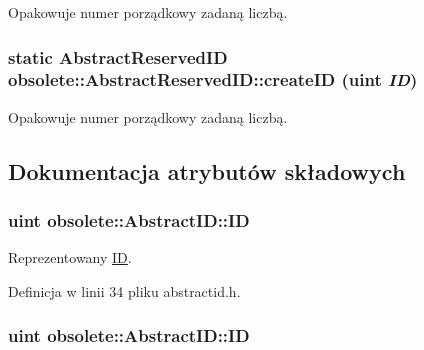 Opakowuje numer porządkowy zadaną liczbą. 

\hypertarget{classobsolete_1_1AbstractReservedID_a38fa00bf6097ab9cff285c8480c8097e}{
\subsubsection[{createID}]{\setlength{\rightskip}{0pt plus 5cm}static {\bf AbstractReservedID} obsolete::AbstractReservedID::createID (uint {\em ID})}}
\label{classobsolete_1_1AbstractReservedID_a38fa00bf6097ab9cff285c8480c8097e}


Opakowuje numer porządkowy zadaną liczbą. 



\subsection{Dokumentacja atrybutów składowych}
\hypertarget{classobsolete_1_1AbstractID_a5f67fa1c7d96085f0ef41193b60b570c}{
\subsubsection[{ID}]{\setlength{\rightskip}{0pt plus 5cm}uint {\bf obsolete::AbstractID::ID}}}
\label{classobsolete_1_1AbstractID_a5f67fa1c7d96085f0ef41193b60b570c}


Reprezentowany \hyperlink{classobsolete_1_1ID}{ID}. 



Definicja w linii 34 pliku abstractid.h.

\hypertarget{classobsolete_1_1AbstractID_a5f67fa1c7d96085f0ef41193b60b570c}{
\subsubsection[{ID}]{\setlength{\rightskip}{0pt plus 5cm}uint {\bf obsolete::AbstractID::ID}}}
\label{classobsolete_1_1AbstractID_a5f67fa1c7d96085f0ef41193b60b570c}


